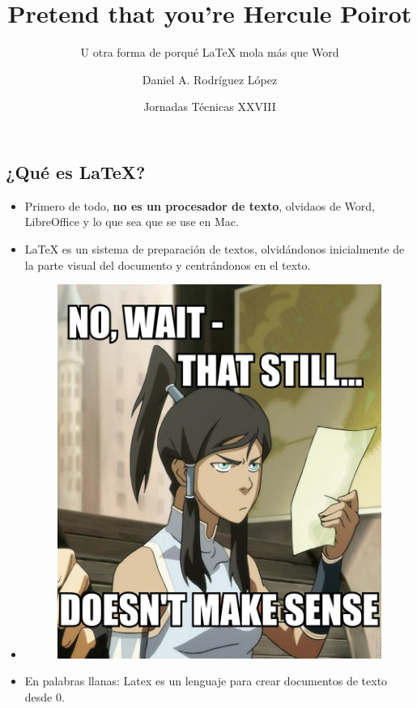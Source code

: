 \documentclass{beamer} %
\title[Pretend that you're Hercule Poirot] %
{Pretend that you're Hercule Poirot}
\subtitle{U otra forma de porqué LaTeX mola más que Word}
\author[Daniel A. Rodríguez López] %
  {Daniel A. Rodríguez López}
\date[XX-04-2016] %
  {Jornadas Técnicas XXVIII}
\begin{document}
  \frame{\titlepage}

  \begin{frame}
    \section*{¿Qué es LaTeX?}
    \begin{itemize}
      \item <1->Primero de todo, \textbf{no es un procesador de texto}, olvidaos de Word, LibreOffice y lo que sea que se use en Mac.\\

      \item <2->LaTeX es un sistema de preparación de textos, olvidándonos inicialmente de la parte visual del documento y centrándonos en el texto.
      \item <3->\begin{figure}
        \includegraphics[scale=0.1]{images/imagen3}
      \end{figure}
      \item <4-> En palabras llanas: Latex es un lenguaje para crear documentos de texto desde 0.
    \end{itemize}
  \end{frame}
\end{document}
